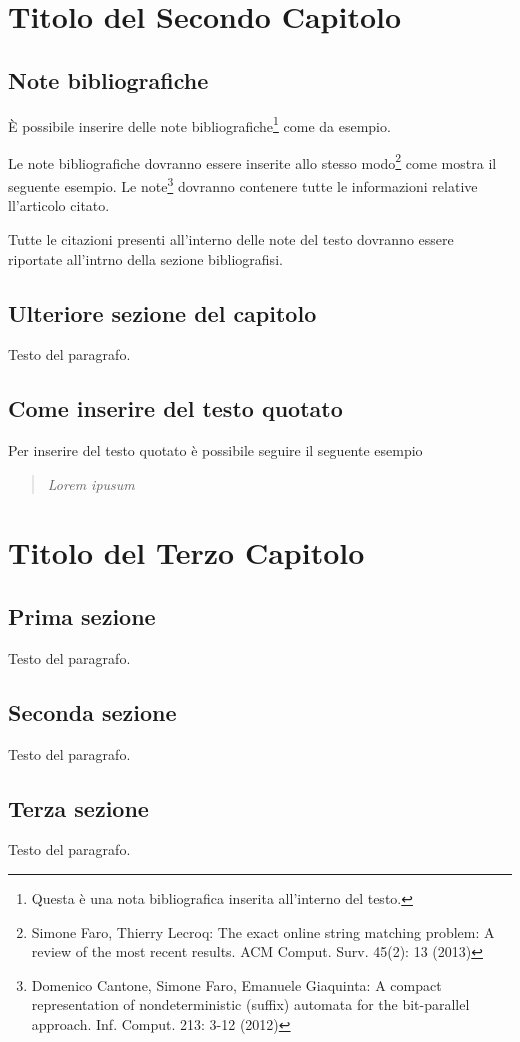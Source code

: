 \chapter{Titolo del Secondo Capitolo}
\vspace{4cm}


\section{Note bibliografiche}
\`E possibile inserire delle note bibliografiche\footnote{Questa \`e una nota bibliografica inserita all'interno del testo.} come da esempio.

Le note bibliografiche dovranno essere inserite allo stesso modo\footnote{Simone Faro, Thierry Lecroq: The exact online string matching problem: A review of the most recent results. ACM Comput. Surv. 45(2): 13 (2013)} come mostra il seguente esempio. 
Le note\footnote{Domenico Cantone, Simone Faro, Emanuele Giaquinta: A compact representation of nondeterministic (suffix) automata for the bit-parallel approach. Inf. Comput. 213: 3-12 (2012)} dovranno contenere tutte le informazioni relative ll'articolo citato. 

Tutte le citazioni presenti all'interno delle note del testo dovranno essere riportate all'intrno della sezione bibliografisi.
\section{Ulteriore sezione del capitolo}
Testo del paragrafo.


\section{Come inserire del testo quotato}

Per inserire del testo quotato \`e possibile seguire il seguente esempio

\begin{quote}
	\emph{Lorem ipusum}
\end{quote}


\chapter{Titolo del Terzo Capitolo}
\vspace{4cm}


\section{Prima sezione}
Testo del paragrafo.

\section{Seconda sezione}
Testo del paragrafo.

\section{Terza sezione}
Testo del paragrafo.





